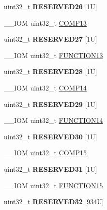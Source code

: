 \begin{DoxyCompactItemize}
uint32\+\_\+t {\bfseries R\+E\+S\+E\+R\+V\+E\+D26} \mbox{[}1\+U\mbox{]}
\item 
\+\_\+\+\_\+\+I\+OM uint32\+\_\+t \mbox{\hyperlink{struct_d_w_t___type_a8e7c69cbac19ef0b26b0ae0cc928da36}{C\+O\+M\+P13}}
\item 
\mbox{\label{struct_d_w_t___type_ab2616eeaef16e043f78f8fd70c28343b}} 
uint32\+\_\+t {\bfseries R\+E\+S\+E\+R\+V\+E\+D27} \mbox{[}1\+U\mbox{]}
\item 
\+\_\+\+\_\+\+I\+OM uint32\+\_\+t \mbox{\hyperlink{struct_d_w_t___type_a72376480973424928cdc455caf65ff17}{F\+U\+N\+C\+T\+I\+O\+N13}}
\item 
\mbox{\label{struct_d_w_t___type_aa01a9b92d0df2a2c48314908696bc327}} 
uint32\+\_\+t {\bfseries R\+E\+S\+E\+R\+V\+E\+D28} \mbox{[}1\+U\mbox{]}
\item 
\+\_\+\+\_\+\+I\+OM uint32\+\_\+t \mbox{\hyperlink{struct_d_w_t___type_af5930659b3107c17fa71e61803d63f97}{C\+O\+M\+P14}}
\item 
\mbox{\label{struct_d_w_t___type_a943f635a1ccfae4b50c837b540c1dda7}} 
uint32\+\_\+t {\bfseries R\+E\+S\+E\+R\+V\+E\+D29} \mbox{[}1\+U\mbox{]}
\item 
\+\_\+\+\_\+\+I\+OM uint32\+\_\+t \mbox{\hyperlink{struct_d_w_t___type_aa11d2375486524bb0503fb100a5350af}{F\+U\+N\+C\+T\+I\+O\+N14}}
\item 
\mbox{\label{struct_d_w_t___type_a7d80a58642fbf3d12fd3fe56edcd58be}} 
uint32\+\_\+t {\bfseries R\+E\+S\+E\+R\+V\+E\+D30} \mbox{[}1\+U\mbox{]}
\item 
\+\_\+\+\_\+\+I\+OM uint32\+\_\+t \mbox{\hyperlink{struct_d_w_t___type_ae55e0087f992cfd56003fc3fe1394cb0}{C\+O\+M\+P15}}
\item 
\mbox{\label{struct_d_w_t___type_a425a2332a06a717c38a5997b14425eb2}} 
uint32\+\_\+t {\bfseries R\+E\+S\+E\+R\+V\+E\+D31} \mbox{[}1\+U\mbox{]}
\item 
\+\_\+\+\_\+\+I\+OM uint32\+\_\+t \mbox{\hyperlink{struct_d_w_t___type_ac08524fa409351f1dedf993cc2d3b2b7}{F\+U\+N\+C\+T\+I\+O\+N15}}
\item 
\mbox{\label{struct_d_w_t___type_a1f1b36d682ed46ff0abe3b064e55e747}} 
uint32\+\_\+t {\bfseries R\+E\+S\+E\+R\+V\+E\+D32} \mbox{[}934\+U\mbox{]}

\end{DoxyCompactItemize}
